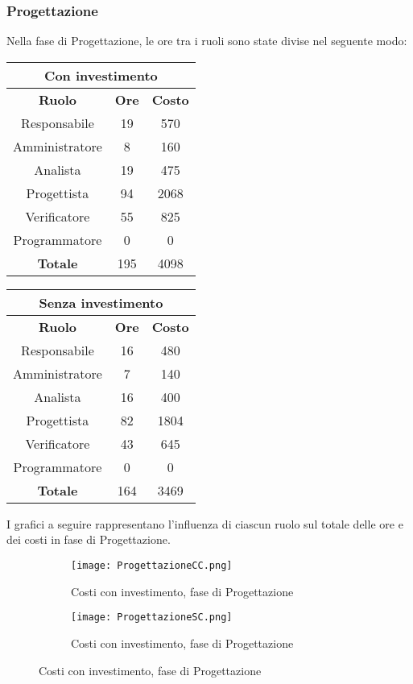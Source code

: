 \documentclass{scalatekids-article}
\begin{document}
\subsubsection{Progettazione}
Nella fase di Progettazione, le ore tra i ruoli sono state divise nel seguente modo:
\begin{center}
  \normalsize
  \begin{tabular}{| c | c | c |}
    \hline
    \multicolumn{3}{|c|}{\textbf{Con investimento}}\\
    \hline
    \textbf{Ruolo} & \textbf{Ore} & \textbf{Costo}\\
    \hline
    Responsabile & 19 & 570\\
    Amministratore & 8 & 160\\
    Analista & 19 & 475\\
    Progettista & 94 & 2068\\
    Verificatore & 55 & 825 \\
    Programmatore & 0 & 0 \\
    \hline
    \textbf{Totale} & 195 & 4098\\
    \hline
  \end{tabular}
  \qquad
  \begin{tabular}{| c | c | c |}
    \hline
    \multicolumn{3}{|c|}{\textbf{Senza investimento}}\\
    \hline
    \textbf{Ruolo} & \textbf{Ore} & \textbf{Costo}\\
    \hline
    Responsabile & 16 & 480\\
    Amministratore & 7 & 140\\
    Analista & 16 & 400\\
    Progettista & 82 & 1804\\
    Verificatore & 43 & 645 \\
    Programmatore & 0 & 0 \\
    \hline
    \textbf{Totale} & 164 & 3469\\
    \hline
  \end{tabular}
\end{center}
I grafici a seguire rappresentano l'influenza di ciascun ruolo sul totale delle ore e dei costi in fase di Progettazione.
\begin{figure}[H]
  \begin{subfigure}[H]{0.47\textwidth}
    \texttt{[image: ProgettazioneCC.png]}
    \caption{Costi con investimento, fase di Progettazione}
  \end{subfigure}
  \qquad
  \begin{subfigure}[H]{0.47\textwidth}
    \texttt{[image: ProgettazioneSC.png]}
    \caption{Costi con investimento, fase di Progettazione}
  \end{subfigure}
\end{figure}
\newpage
\end{document}
